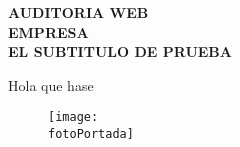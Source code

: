 \documentclass[a4paper]{article}
\newcommand{\titulo}{AUDITORIA WEB \\[0.5cm] EMPRESA}
\newcommand{\subtitulo}{EL SUBTITULO DE PRUEBA}
\newcommand{\primertexto}{Hola que hase}
\newcommand{\fotoPortada}{Imagenes/twitch_logo.png}
\begin{document}
    \begin{titlepage}
        \centering
        {\bfseries \fontsize{30}{28}\selectfont \textcolor{colorTitulo}{\titulo}} \\[1cm]
        {\bfseries \fontsize{14}{16}\selectfont \textcolor{colorSubtitulo}{\subtitulo}}
        \par\vspace{1cm}
        \primertexto
        \par\vspace{8cm}
    \end{titlepage}


    \begin{figure}
    \centering
    \texttt{[image: \\fotoPortada]}
    \end{figure}
\end{document}
